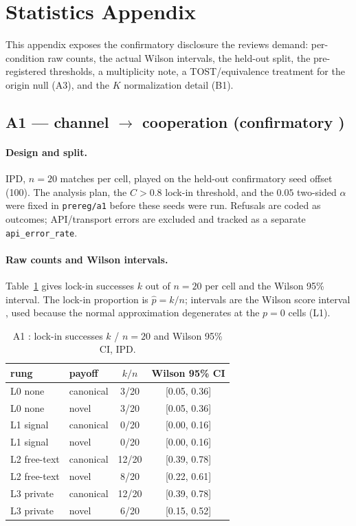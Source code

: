 \section{Statistics Appendix}
\label{app:stats}

This appendix exposes the confirmatory disclosure the reviews demand: per-condition raw
counts, the actual Wilson intervals, the held-out split, the pre-registered thresholds, a
multiplicity note, a TOST/equivalence treatment for the origin null (A3), and the $K$
normalization detail (B1).

\subsection{A1 --- channel $\to$ cooperation (confirmatory \tC)}
\label{app:a1}

\paragraph{Design and split.} IPD, $n{=}20$ matches per cell, played on the held-out
confirmatory seed offset (100). The analysis plan, the $C>0.8$ lock-in threshold, and the
$0.05$ two-sided $\alpha$ were fixed in \texttt{prereg/a1} before these seeds were run.
Refusals are coded as outcomes; API/transport errors are excluded and tracked as a separate
\texttt{api\_error\_rate}.

\paragraph{Raw counts and Wilson intervals.}
Table~\ref{tab:app-a1} gives lock-in successes $k$ out of $n{=}20$ per cell and the Wilson
95\% interval. The lock-in proportion is $\hat p = k/n$; intervals are the Wilson score
interval \citep{wilson1927probable}, used because the normal approximation degenerates at the
$p{=}0$ cells (L1).

\begin{table}[h]
\centering
\caption{A1 \tC{}: lock-in successes $k$ / $n{=}20$ and Wilson 95\% CI, IPD.}
\label{tab:app-a1}
\small
\begin{tabular}{llcc}
\toprule
rung & payoff & $k/n$ & Wilson 95\% CI \\
\midrule
L0 none      & canonical & 3/20 & [0.05, 0.36] \\
L0 none      & novel     & 3/20 & [0.05, 0.36] \\
L1 signal    & canonical & 0/20 & [0.00, 0.16] \\
L1 signal    & novel     & 0/20 & [0.00, 0.16] \\
L2 free-text & canonical & 12/20 & [0.39, 0.78] \\
L2 free-text & novel     & 8/20 & [0.22, 0.61] \\
L3 private   & canonical & 12/20 & [0.39, 0.78] \\
L3 private   & novel     & 6/20 & [0.15, 0.52] \\
\bottomrule
\end{tabular}
\end{table}

